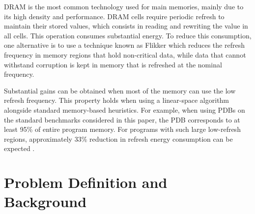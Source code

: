\documentclass[letterpaper]{article}
\begin{document}
DRAM is the most common technology used for main memories, mainly due to its high density and performance. DRAM cells require periodic refresh to maintain their stored values, which consists in reading and rewriting the value in all cells. This operation consumes substantial energy. To reduce this consumption, one alternative is to use a technique known as Flikker \cite{Liu:2011:FSD:1950365.1950391} which reduces the refresh frequency in memory regions that hold non-critical data, %
while data that cannot withstand corruption is kept in memory that is refreshed at the nominal frequency. %

Substantial gains can be obtained when most of the memory can use the low refresh frequency. This property holds when using a linear-space algorithm alongside standard memory-based heuristics. For example, when using PDBs on the standard benchmarks considered in this paper, the PDB corresponds to at least 95\% of entire program memory. For programs with such large low-refresh regions, approximately 33\% reduction in refresh energy consumption can be expected \cite{Liu:2011:FSD:1950365.1950391}.


\section{Problem Definition and Background}


\end{document}
